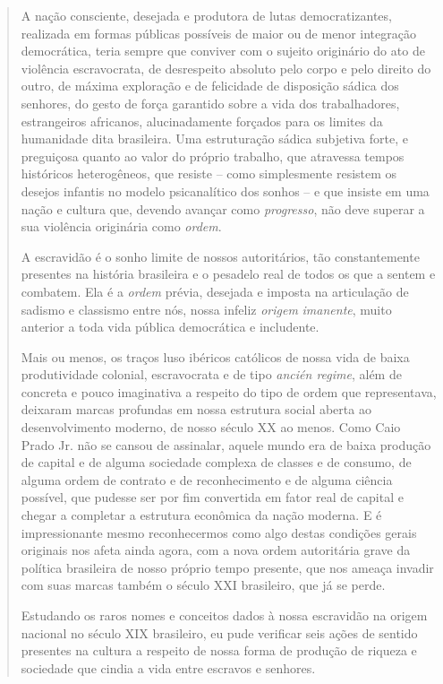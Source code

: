\begin{quote}
A nação consciente, desejada e produtora de lutas democratizantes,
realizada em formas públicas possíveis de maior ou de menor integração
democrática, teria sempre que conviver com o sujeito originário do ato
de violência escravocrata, de desrespeito absoluto pelo corpo e pelo
direito do outro, de máxima exploração e de felicidade de disposição
sádica dos senhores, do gesto de força garantido sobre a vida dos
trabalhadores, estrangeiros africanos, alucinadamente forçados para os
limites da humanidade dita brasileira. Uma estruturação sádica subjetiva
forte, e preguiçosa quanto ao valor do próprio trabalho, que atravessa
tempos históricos heterogêneos, que resiste -- como simplesmente
resistem os desejos infantis no modelo psicanalítico dos sonhos -- e que
insiste em uma nação e cultura que, devendo avançar como
\emph{progresso}, não deve superar a sua violência originária como
\emph{ordem}.

A escravidão é o sonho limite de nossos autoritários, tão constantemente
presentes na história brasileira e o pesadelo real de todos os que a
sentem e combatem. Ela é a \emph{ordem} prévia, desejada e imposta na
articulação de sadismo e classismo entre nós, nossa infeliz
\emph{origem} \emph{imanente}, muito anterior a toda vida pública
democrática e includente.

Mais ou menos, os traços luso ibéricos católicos de nossa vida de baixa
produtividade colonial, escravocrata e de tipo \emph{ancién regime},
além de concreta e pouco imaginativa a respeito do tipo de ordem que
representava, deixaram marcas profundas em nossa estrutura social aberta
ao desenvolvimento moderno, de nosso século XX ao menos. Como Caio Prado
Jr. não se cansou de assinalar, aquele mundo era de baixa produção de
capital e de alguma sociedade complexa de classes e de consumo, de
alguma ordem de contrato e de reconhecimento e de alguma ciência
possível, que pudesse ser por fim convertida em fator real de capital e
chegar a completar a estrutura econômica da nação moderna. E é
impressionante mesmo reconhecermos como algo destas condições gerais
originais nos afeta ainda agora, com a nova ordem autoritária grave da
política brasileira de nosso próprio tempo presente, que nos ameaça
invadir com suas marcas também o século XXI brasileiro, que já se perde.

Estudando os raros nomes e conceitos dados à nossa escravidão na origem
nacional no século XIX brasileiro, eu pude verificar seis ações de
sentido presentes na cultura a respeito de nossa forma de produção de
riqueza e sociedade que cindia a vida entre escravos e senhores.


\end{quote}

